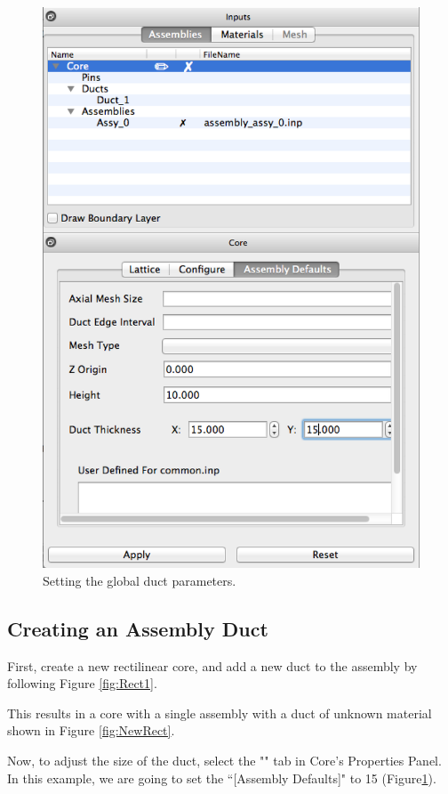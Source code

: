 \begin{figure}
\vspace{-60pt}
  \begin{center}
    \includegraphics[width=0.75\linewidth]{Images/rect-set-dim.png}
  \end{center}
 \caption{Setting the global duct parameters.}
\label{fig:SetRectDuctDem}
\vspace{-60pt}
\end{figure}

\subsection{Creating an Assembly Duct}

First, create a new rectilinear core, and add a new duct to the assembly by following Figure \ref{fig:Rect1}.

This results in a core with a single assembly with a duct of unknown material shown in Figure \ref{fig:NewRect}.

Now, to adjust the size of the duct, select the "" tab in Core's Properties Panel.  In this example, we are going to set the ``[Assembly Defaults]" to 15 (Figure\ref{fig:SetRectDuctDem}).

